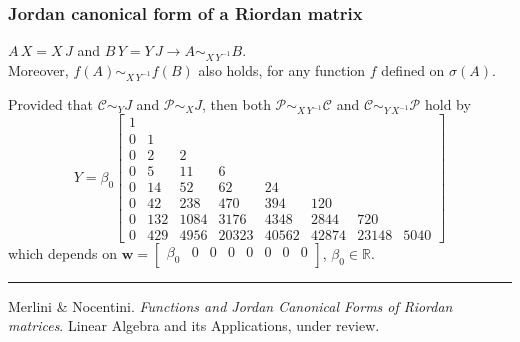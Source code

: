 \documentclass[9pt]{beamer}
\begin{document}
\begin{frame}[fragile]
\frametitle{Jordan canonical form of a Riordan matrix}
\begin{theorem}
$A\,X = X\,J$ and $B\,Y= Y\,J \rightarrow A \sim_{X\,Y^{-1}} B$. \\
Moreover, $f(A) \sim_{X\,Y^{-1}} f(B)$ also holds, for any
function $f$ defined on $\sigma(A)$.
\end{theorem}
Provided that $\mathcal{C}\sim_{Y}J$ and $\mathcal{P}\sim_{X}J$, then both
$\mathcal{P} \sim_{X\,Y^{-1}}\mathcal{C}$ and $\mathcal{C}
\sim_{Y\,X^{-1}}\mathcal{P}$ hold by
\begin{displaymath}
Y = \beta_{0} \left[\begin{matrix}1 &  &  &  &  &  &  & \\0 & 1 &  &  &  &  &  & \\0 & 2 & 2 &  &  &  &  & \\0 & 5 & 11 & 6 &  &  &  & \\0 & 14 & 52 & 62 & 24 &  &  & \\0 & 42 & 238 & 470 & 394 & 120 &  & \\0 & 132 & 1084 & 3176 & 4348 & 2844 & 720 & \\0 & 429 & 4956 & 20323 & 40562 & 42874 & 23148 & 5040\end{matrix}\right]
\end{displaymath}
which depends on $\displaystyle\boldsymbol{w}= \left[\begin{matrix} \beta_{0} &
0 & 0 & 0 & 0 & 0 & 0 & 0 \end{matrix}\right]$, $\beta_{0}\in\mathbb{R}$.
\vfill
\noindent\rule{\textwidth}{0.1pt}
{\footnotesize
Merlini \& Nocentini. \textit{Functions and Jordan Canonical Forms of Riordan
matrices}. \newline Linear Algebra and its Applications, under review.}
\end{frame}
\end{document}
